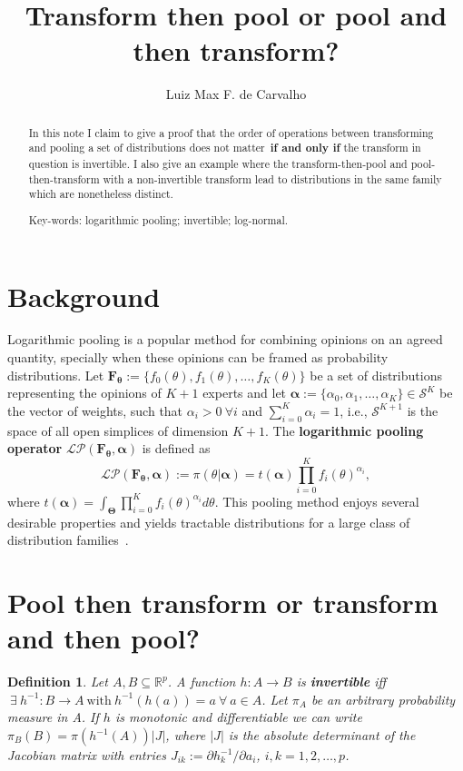 \documentclass[a4paper, notitlepage, 10pt]{article}
\title{\vspace{-9ex}\centering \bf Transform then pool or pool and then transform?}
\author{
Luiz Max F. de Carvalho\\
}
\newtheorem{definition}{Definition}[]
\begin{document}
\maketitle

\begin{abstract}
In this note I claim to give a proof that the order of operations between transforming and pooling a set of distributions does not matter~\textbf{if and only if} the transform in question is invertible.
I also give an example where the transform-then-pool and pool-then-transform with a non-invertible transform lead to distributions in the same family which are nonetheless distinct.


Key-words: logarithmic pooling; invertible; log-normal. 
\end{abstract}

\section*{Background}

Logarithmic pooling is a popular method for combining opinions on an agreed quantity, specially when these opinions can be framed as probability distributions.
Let $\mathbf{F_\theta} := \{f_0(\theta), f_1(\theta), \ldots, f_K(\theta)\}$ be a set of distributions representing the opinions of $K + 1$ experts and let $\boldsymbol\alpha :=\{\alpha_0, \alpha_1, \ldots, \alpha_K \} \in \mathcal{S}^K$ be the vector of weights, such that $\alpha_i > 0\: \forall i$ and $\sum_{i=0}^K \alpha_i = 1$, i.e., $\mathcal{S}^{K + 1}$ is the space of all open simplices of dimension $K + 1$.
The \textbf{logarithmic pooling operator} $\mathcal{LP}(\mathbf{F_\theta}, \boldsymbol\alpha)$ is defined as
\begin{equation}
\label{eq:logpool}
 \mathcal{LP}(\mathbf{F_\theta}, \boldsymbol\alpha) :=  \pi(\theta | \boldsymbol\alpha) = t(\boldsymbol\alpha) \prod_{i=0}^K f_i(\theta)^{\alpha_i},
\end{equation}
where $t(\boldsymbol\alpha) = \int_{\boldsymbol\Theta}\prod_{i=0}^K f_i(\theta)^{\alpha_i}d\theta$.
This pooling method enjoys several desirable properties and yields tractable distributions for a large class of distribution families~\citep{genest1984}.

\section*{Pool then transform or transform and then pool?}

\begin{definition}
Let $A, B \subseteq \mathbb{R}^p$.
A function  $h: A \to B$ is \textbf{invertible} iff $\: \exists \: h^{-1}: B \to A \: \text{with} \: h^{-1}(h(a)) = a \: \forall \: a \in A$. 
Let $\pi_A$ be an arbitrary probability measure in A. 
If $h$ is monotonic and differentiable we can write $\pi_B(B) = \pi(h^{-1}(A))|J|$, where $|J|$ is the absolute determinant of the Jacobian matrix with entries $J_{ik} := \partial h_k^{-1}/\partial a_i$, $i,k = 1, 2, \ldots, p$.
\end{definition}
\end{document}
